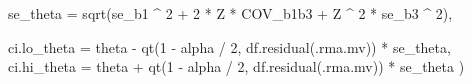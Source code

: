 \documentclass[
]{book}
\newenvironment{Shaded}{\begin{snugshade}}{\end{snugshade}}
\newcommand{\AttributeTok}[1]{\textcolor[rgb]{0.77,0.63,0.00}{#1}}
\newcommand{\DecValTok}[1]{\textcolor[rgb]{0.00,0.00,0.81}{#1}}
\newcommand{\FunctionTok}[1]{\textcolor[rgb]{0.00,0.00,0.00}{#1}}
\newcommand{\NormalTok}[1]{#1}
\newcommand{\SpecialCharTok}[1]{\textcolor[rgb]{0.00,0.00,0.00}{#1}}
\begin{document}
\begin{Shaded}
\begin{Highlighting}[]
        \AttributeTok{se\_theta =} \FunctionTok{sqrt}\NormalTok{(se\_b1 }\SpecialCharTok{\^{}} \DecValTok{2} \SpecialCharTok{+} \DecValTok{2} \SpecialCharTok{*}\NormalTok{ Z }\SpecialCharTok{*}\NormalTok{ COV\_b1b3 }\SpecialCharTok{+}\NormalTok{ Z }\SpecialCharTok{\^{}} \DecValTok{2} \SpecialCharTok{*}\NormalTok{ se\_b3 }\SpecialCharTok{\^{}} \DecValTok{2}\NormalTok{),}
        
        \AttributeTok{ci.lo\_theta =}\NormalTok{ theta }\SpecialCharTok{{-}} \FunctionTok{qt}\NormalTok{(}\DecValTok{1} \SpecialCharTok{{-}}\NormalTok{ alpha }\SpecialCharTok{/} \DecValTok{2}\NormalTok{, }\FunctionTok{df.residual}\NormalTok{(.rma.mv)) }\SpecialCharTok{*}\NormalTok{ se\_theta,}
        \AttributeTok{ci.hi\_theta =}\NormalTok{ theta }\SpecialCharTok{+} \FunctionTok{qt}\NormalTok{(}\DecValTok{1} \SpecialCharTok{{-}}\NormalTok{ alpha }\SpecialCharTok{/} \DecValTok{2}\NormalTok{, }\FunctionTok{df.residual}\NormalTok{(.rma.mv)) }\SpecialCharTok{*}\NormalTok{ se\_theta}
\NormalTok{    )}
    

\end{Highlighting}
\end{Shaded}
\end{document}
